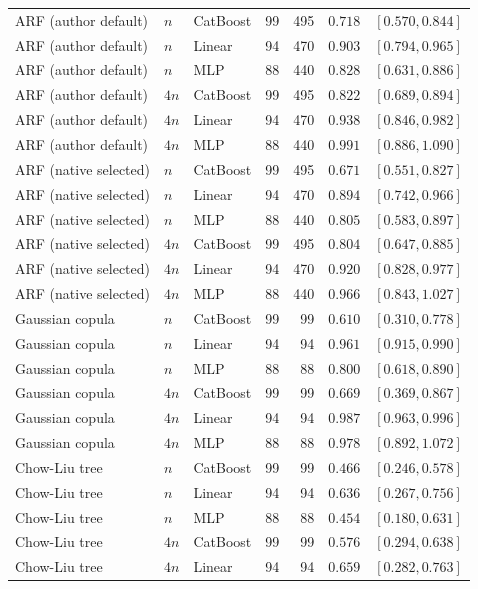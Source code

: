 \begin{longtable}{@{}p{1.6in}llrrrl@{}}
ARF (author default) & $n$ & CatBoost & 99 & 495 & $0.718$ & $[0.570, 0.844]$ \\
ARF (author default) & $n$ & Linear & 94 & 470 & $0.903$ & $[0.794, 0.965]$ \\
ARF (author default) & $n$ & MLP & 88 & 440 & $0.828$ & $[0.631, 0.886]$ \\
ARF (author default) & $4n$ & CatBoost & 99 & 495 & $0.822$ & $[0.689, 0.894]$ \\
ARF (author default) & $4n$ & Linear & 94 & 470 & $0.938$ & $[0.846, 0.982]$ \\
ARF (author default) & $4n$ & MLP & 88 & 440 & $0.991$ & $[0.886, 1.090]$ \\
ARF (native selected) & $n$ & CatBoost & 99 & 495 & $0.671$ & $[0.551, 0.827]$ \\
ARF (native selected) & $n$ & Linear & 94 & 470 & $0.894$ & $[0.742, 0.966]$ \\
ARF (native selected) & $n$ & MLP & 88 & 440 & $0.805$ & $[0.583, 0.897]$ \\
ARF (native selected) & $4n$ & CatBoost & 99 & 495 & $0.804$ & $[0.647, 0.885]$ \\
ARF (native selected) & $4n$ & Linear & 94 & 470 & $0.920$ & $[0.828, 0.977]$ \\
ARF (native selected) & $4n$ & MLP & 88 & 440 & $0.966$ & $[0.843, 1.027]$ \\
Gaussian copula & $n$ & CatBoost & 99 & 99 & $0.610$ & $[0.310, 0.778]$ \\
Gaussian copula & $n$ & Linear & 94 & 94 & $0.961$ & $[0.915, 0.990]$ \\
Gaussian copula & $n$ & MLP & 88 & 88 & $0.800$ & $[0.618, 0.890]$ \\
Gaussian copula & $4n$ & CatBoost & 99 & 99 & $0.669$ & $[0.369, 0.867]$ \\
Gaussian copula & $4n$ & Linear & 94 & 94 & $0.987$ & $[0.963, 0.996]$ \\
Gaussian copula & $4n$ & MLP & 88 & 88 & $0.978$ & $[0.892, 1.072]$ \\
Chow-Liu tree & $n$ & CatBoost & 99 & 99 & $0.466$ & $[0.246, 0.578]$ \\
Chow-Liu tree & $n$ & Linear & 94 & 94 & $0.636$ & $[0.267, 0.756]$ \\
Chow-Liu tree & $n$ & MLP & 88 & 88 & $0.454$ & $[0.180, 0.631]$ \\
Chow-Liu tree & $4n$ & CatBoost & 99 & 99 & $0.576$ & $[0.294, 0.638]$ \\
Chow-Liu tree & $4n$ & Linear & 94 & 94 & $0.659$ & $[0.282, 0.763]$ \\

\end{longtable}
